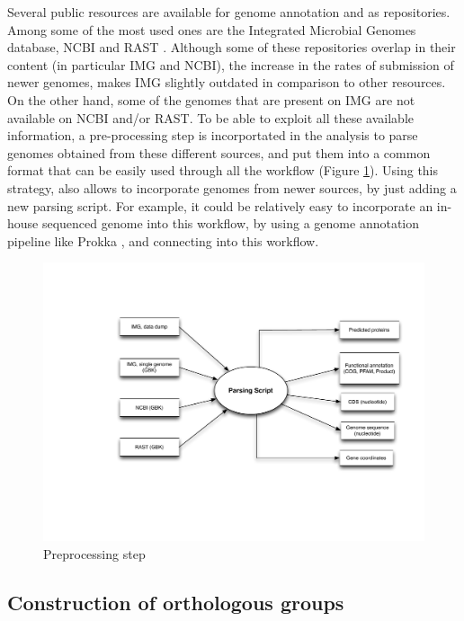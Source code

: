 Several public resources are available for genome annotation and as repositories. Among some of the most used ones are the Integrated Microbial Genomes database\cite{Markowitz:2011ck}, NCBI and RAST \cite{Aziz:2008ku}. Although some of these repositories overlap in their content (in particular IMG and NCBI), the increase in the rates of submission of newer genomes, makes IMG slightly outdated in comparison to other resources. On the other hand, some of the genomes that are present on IMG are not available on NCBI and/or RAST. To be able to exploit all these available information, a pre-processing step is incorportated in the analysis to parse genomes obtained from these different sources, and put them into a common format that can be easily used through all the workflow (Figure \ref{Preprocessing}). Using this strategy, also allows to incorporate genomes from newer sources, by just adding a new parsing script. For example, it could be relatively easy to incorporate an in-house sequenced genome into this workflow, by using a genome annotation pipeline like Prokka \cite{Seemann:2014ks}, and connecting into this workflow.

\begin{figure}[htbp]
	\centering
	\includegraphics[width=\textwidth]{Chapter6/Figures/PreprocessingOverview.pdf}
	\caption{Preprocessing step}
	\label{Preprocessing}
\end{figure}

\subsection{Construction of orthologous groups}

